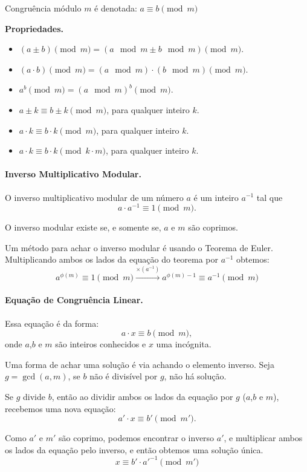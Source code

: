 Congruência módulo $m$ é denotada: $a \equiv b \pmod m$

\textbf{Propriedades.}
\begin{multicols}{2}
    \begin{itemize}
        \item $(a \pm b) \pmod m = (a \mod m \pm b \mod m) \pmod m$.
        \item $(a \cdot b) \pmod m = (a \mod m)\cdot(b\mod m) \pmod m$.
        \item $a^b \pmod m = (a \mod m)^b \pmod m$.
        \item $a \pm k \equiv b \pm k \pmod m$, para qualquer inteiro $k$.
        \item $a \cdot k \equiv b \cdot k \pmod m$, para qualquer inteiro $k$.
        \item $a \cdot k \equiv b \cdot k \pmod {k\cdot m}$, para qualquer inteiro $k$.
    \end{itemize}
    
\end{multicols}

\paragraph{Inverso Multiplicativo Modular.} O inverso multiplicativo modular de um número $a$ é um inteiro $a^{-1}$ tal que
$$a\cdot a^{-1} \equiv 1 \pmod m.$$

O inverso modular existe se, e somente se, $a$ e $m$ são coprimos.

Um método para achar o inverso modular é usando o Teorema de Euler. Multiplicando ambos os lados da equação do teorema por $a^{-1}$ obtemos:
$$a^{\phi(m)} \equiv 1 \pmod m \xrightarrow{\times (a^{-1})} a^{\phi(m)-1} \equiv a^{-1} \pmod m$$

\paragraph{Equação de Congruência Linear.} Essa equação é da forma:
$$a\cdot x \equiv b \pmod m,$$
onde $a$,$b$ e $m$ são inteiros conhecidos e $x$ uma incógnita.

Uma forma de achar uma solução é via achando o elemento inverso. Seja $g = \gcd(a,m)$, se $b$ não é divisível por $g$, não há solução. 

Se $g$ divide $b$, então ao dividir ambos os lados da equação por $g$ ($a$,$b$ e $m$), recebemos uma nova equação:
$$a'\cdot x \equiv b' \pmod{m'}.$$

Como $a'$ e $m'$ são coprimo, podemos encontrar o inverso $a'$, e multiplicar ambos os lados da equação pelo inverso, e então obtemos uma solução única.
$$x \equiv b'\cdot a'^{-1} \pmod{m'}$$

